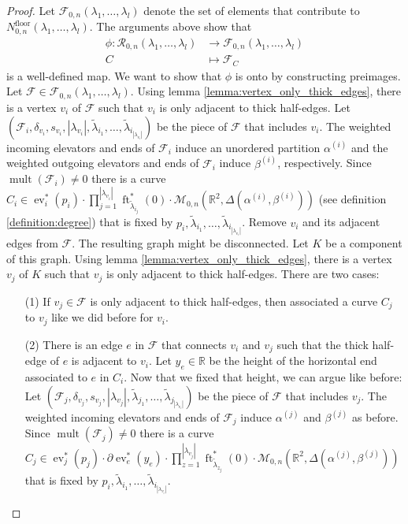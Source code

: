 \documentclass[11pt,reqno,a4]{amsart}
\theoremstyle{dotless}
\theoremstyle{definition}
\newcommand{\mult}{\operatorname{mult}}
\newcommand{\ft}{\operatorname{ft}}
\newcommand{\ev}{\operatorname{ev}}
\begin{document}
\begin{proof}
Let $\mathcal{F}_{0,n}\left(\lambda_1,\dots,\lambda_l\right)$ denote the set of elements that contribute to $N_{0,n}^{\textrm{floor}}\left(\lambda_1,\dots,\lambda_l\right)$. The arguments above show that
\begin{align*}
\phi:\mathcal{R}_{0,n}\left(\lambda_1,\dots,\lambda_l\right)&\to \mathcal{F}_{0,n}\left(\lambda_1,\dots,\lambda_l\right)\\
C&\mapsto \mathcal{F}_C
\end{align*}
is a well-defined map. We want to show that $\phi$ is onto by constructing preimages. Let $\mathcal{F}\in\mathcal{F}_{0,n}\left(\lambda_1,\dots,\lambda_l\right)$. Using lemma \ref{lemma:vertex_only_thick_edges}, there is a vertex $v_i$ of $\mathcal{F}$ such that $v_i$ is only adjacent to thick half-edges. Let $\left(\mathcal{F}_i,\delta_{v_i},s_{v_i},|\lambda_{v_i}|,\tilde{\lambda}_{i_1},\dots,\tilde{\lambda}_{i_{|\lambda_{v_i}|}}\right)$ be the piece of $\mathcal{F}$ that includes $v_i$. The weighted incoming elevators and ends of $\mathcal{F}_i$ induce an unordered partition $\alpha^{(i)}$ and the weighted outgoing elevators and ends of $\mathcal{F}_i$ induce $\beta^{(i)}$, respectively. Since $\mult(\mathcal{F}_i)\neq 0$ there is a curve $C_i\in\ev^*_i(p_i) \cdot \prod_{j=1}^{|\lambda_{v_i}|}\ft_{\tilde{\lambda}_{i_j}}^*\left( 0\right) \cdot \mathcal{M}_{0,n}\left(\mathbb{R}^2,\Delta\left(\alpha^{(i)},\beta^{(i)}\right) \right)$ (see definition \ref{definition:degree}) that is fixed by $p_i,\tilde{\lambda}_{i_1},\dots,\tilde{\lambda}_{i_{|\lambda_{v_i}|}}$. Remove $v_i$ and its adjacent edges from $\mathcal{F}$. The resulting graph might be disconnected. Let $K$ be a component of this graph. Using lemma \ref{lemma:vertex_only_thick_edges}, there is a vertex $v_j$ of $K$ such that $v_j$ is only adjacent to thick half-edges. There are two cases:
\begin{itemize}
\item[(1)]
If $v_j\in\mathcal{F}$ is only adjacent to thick half-edges, then associated a curve $C_j$ to $v_j$ like we did before for $v_i$.
\item[(2)]
There is an edge $e$ in $\mathcal{F}$ that connects $v_i$ and $v_j$ such that the thick half-edge of $e$ is adjacent to $v_i$. Let $y_e\in\mathbb{R}$ be the height of the horizontal end associated to $e$ in $C_i$. Now that we fixed that height, we can argue like before: Let $\left(\mathcal{F}_j,\delta_{v_j},s_{v_j},|\lambda_{v_j}|,\tilde{\lambda}_{j_1},\dots,\tilde{\lambda}_{j_{|\lambda_{v_i}|}}\right)$ be the piece of $\mathcal{F}$ that includes $v_j$. The weighted incoming elevators and ends of $\mathcal{F}_j$ induce $\alpha^{(j)}$ and $\beta^{(j)}$ as before. Since $\mult(\mathcal{F}_j)\neq 0$ there is a curve $C_j\in\ev^*_j(p_j) \cdot \partial\ev_e^*\left( y_e \right) \cdot\prod_{z=1}^{|\lambda_{v_j}|}\ft_{\tilde{\lambda}_{z_j}}^*\left( 0\right) \cdot \mathcal{M}_{0,n}\left(\mathbb{R}^2,\Delta\left(\alpha^{(j)},\beta^{(j)}\right) \right)$ that is fixed by $p_i,\tilde{\lambda}_{i_1},\dots,\tilde{\lambda}_{i_{|\lambda_{v_i}|}}$.

\end{itemize}
\end{proof}
\end{document}

